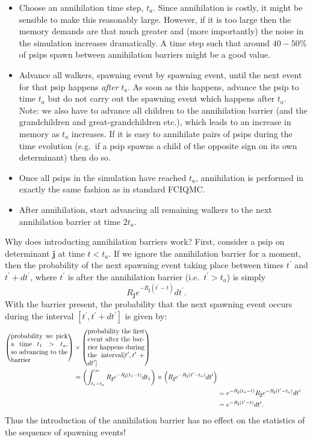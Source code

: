 \documentclass[a4paper, 11pt]{article}
\newcommand{\bj}{\mathbf{j}}
\begin{document}
\begin{itemize}
\item Choose an annihilation time step, $t_a$.  Since annihilation is costly, it might be sensible to make this reasonably large.  However, if it is too large then the memory demands are that much greater and (more importantly) the noise in the simulation increases dramatically.  A time step such that around $40-50\%$ of psips spawn between annihilation barriers might be a good value.
\item Advance all walkers, spawning event by spawning event, until the next event for that psip happens \emph{after} $t_a$.  As soon as this happens, advance the psip to time $t_a$ but do not carry out the spawning event which happens after $t_a$.  Note: we also have to advance all children to the annihilation barrier (and the grandchildren and great-grandchildren etc.), which leads to an increase in memory as $t_a$ increases.  If it is easy to annihilate pairs of psips during the time evolution (e.g.\ if a psip spawns a child of the opposite sign on its own determinant) then do so.
\item Once all psips in the simulation have reached $t_a$, annihilation is performed in exactly the same fashion as in standard FCIQMC.
\item After annihilation, start advancing all remaining walkers to the next annihilation barrier at time $2t_a$.
\end{itemize}

Why does introducting annihilation barriers work?  First, consider a psip on determinant $\bj$ at time $t<t_a$.  If we ignore the annihilation barrier for a moment, then the probability of the next spawning event taking place between times $t^\prime$ and $t^\prime+dt^\prime$, where $t^\prime$ is after the annihilation barrier (i.e.\ $t^\prime>t_a$) is simply
\begin{equation}
R_\bj e^{-R_\bj (t^\prime - t)} dt^\prime.
\end{equation}
With the barrier present, the probability that the next spawning event occurs during the interval $[t^\prime,t^\prime+dt^\prime]$ is given by:
\begin{align}
\begin{split}
\left(\textrm{\parbox{3cm}{probability we pick a time $t_1>t_a$, so advancing to the barrier}}\right) &\times \left(\textrm{\parbox{3cm}{probability the first event after the barrier happens during the interval$[t^\prime,t^\prime+dt^\prime]$}}\right) \\
&=  \left(\int_{t_1=t_a}^\infty R_\bj e^{-R_\bj(t_1-t)} dt_1\right) \times \left(R_\bj e^{-R_\bj(t^\prime-t_a)}dt^\prime\right)
\end{split} \\
&= e^{-R_\bj(t_a-t)} R_\bj e^{-R_\bj(t^\prime-t_a)} dt^\prime \\
&= e^{-R_\bj(t^\prime-t)} dt^\prime.
\end{align}
Thus the introduction of the annihilation barrier has no effect on the statistics of the sequence of spawning events!
\end{document}

